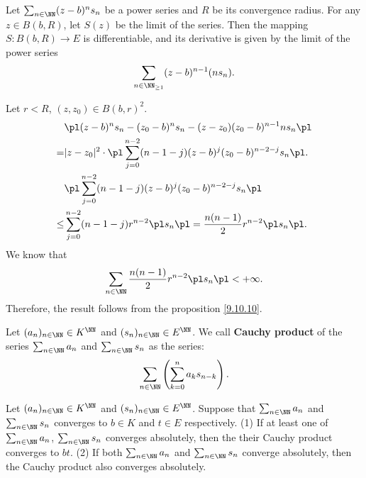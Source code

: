 \begin{theoremenv}
    Let $\sum_{n\in\NN}(z-b)^n s_n$ be a power series and $R$ be its convergence radius. For any $z\in B(b,R)$, let $S(z)$ be the limit of the series.
    Then the mapping $S: B(b,R)\longrightarrow E$ is differentiable, and its derivative is given by the limit of the power series
    $$ \sum_{n\in \NN_{\ge 1}}(z-b)^{n-1}(ns_{n}).$$
\end{theoremenv}
\begin{proofenv}
    Let $r<R$, $(z,z_0)\in B(b,r)^2$.
    \begin{align*}
        &\pl (z-b)^n s_n-(z_0-b)^n s_n- (z-z_0)(z_0-b)^{n-1} n s_n\pl \\
        =& |z-z_0|^2 \cdot\pl \sum_{j=0}^{n-2}(n-1-j)(z-b)^j(z_0-b)^{n-2-j}s_n\pl .\\
        &\pl \sum_{j=0}^{n-2}(n-1-j)(z-b)^j(z_0-b)^{n-2-j}s_n\pl \\
        \le & \sum_{j=0}^{n-2}(n-1-j)r^{n-2}\pl s_n\pl =\frac{n(n-1)}{2} r^{n-2}\pl s_n\pl.
    \end{align*}
    We know that 
    $$ \sum_{n\in\NN}\frac{n(n-1)}{2} r^{n-2} \pl s_n\pl<+\infty.$$
    Therefore, the result follows from the proposition \ref{9.10.10}.
\end{proofenv}
\begin{definitionenv}
    Let $(a_n)_{n\in\NN}\in K^{\NN}$ and $(s_n)_{n\in\NN}\in E^{\NN}$. We call \textbf{Cauchy product} of the series $\sum_{n\in\NN}a_n$ and $\sum_{n\in\NN} s_n$ as the series:
    $$ \sum_{n\in\NN}\left(\sum_{k=0}^{n} a_k s_{n-k}\right).$$
\end{definitionenv}
\begin{theoremenv}[Merterns]
    Let $(a_n)_{n\in\NN}\in K^{\NN}$ and $(s_n)_{n\in\NN}\in E^{\NN}$. Suppose that $\sum_{n\in\NN}a_n$ and $\sum_{n\in \NN}s_n$ converges to $b\in K$ and $t\in E$ respectively.
    \newline
    (1) If at least one of $\sum_{n\in\NN}a_n$, $\sum_{n\in\NN}s_n$ converges absolutely, then the their Cauchy product converges to $bt$.
    \newline
    (2) If both $\sum_{n\in\NN}a_n$ and $\sum_{n\in\NN}s_n$ converge absolutely, then the Cauchy product also converges absolutely.
\end{theoremenv}
